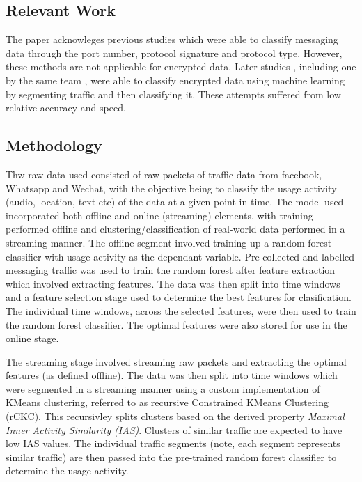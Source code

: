 \documentclass[10pt]{article}
\begin{document}
\subsection{Relevant Work}
The paper acknowleges previous studies \cite{Haffner:2005:AAC:1080173.1080183} \cite{4669733}  \cite{1550864} which were able to classify messaging data through the port number, protocol signature and protocol type. However, these methods are not applicable for encrypted data. Later studies \cite{5693957}, including one by the same team \cite{7377112}, were able to classify encrypted data using machine learning by segmenting traffic and then classifying it. These attempts suffered from low relative accuracy and speed. 



\subsection{Methodology}
Thw raw data used consisted of raw packets of traffic data from facebook, Whatsapp and Wechat, with the objective being to classify the usage activity (audio, location, text etc) of the data at a given point in time. The model used incorporated both offline and online (streaming) elements, with training performed offline and clustering/classification of real-world data performed in a streaming manner. The offline segment involved training up a random forest classifier with usage activity as the dependant variable. Pre-collected and labelled messaging traffic was used to train the random forest after feature extraction which involved extracting features. The data was then split into time windows and a feature selection stage used to determine the best features for clasification. The individual time windows, across the selected features, were then used to train the random forest classifier. The optimal features were also stored for use in the online stage.

The streaming stage involved streaming raw packets and extracting the optimal features (as defined offline). The data was then split into time windows which were segmented in a streaming manner using a custom implementation of KMeans clustering, referred to as recursive Constrained KMeans Clustering (rCKC). This recursivley splits clusters based on the derived property \textit{Maximal Inner Activity Similarity (IAS)}. Clusters of similar traffic are expected to have low IAS values. The individual traffic segments (note, each segment represents similar traffic) are then passed into the pre-trained random forest classifier to determine the usage activity.
\end{document}
